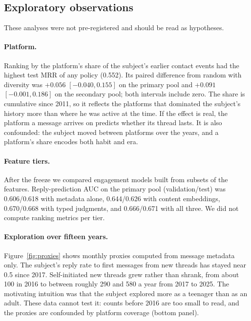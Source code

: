 \documentclass[11pt]{article}
\begin{document}
\subsection{Exploratory observations}
\label{sec:exploratory}

These analyses were not pre-registered and should be read as hypotheses.

\paragraph{Platform.} Ranking by the platform's share of the subject's earlier contact events had the highest test MRR of any policy (0.552). Its paired difference from random with diversity was $+0.056$ $[-0.040, 0.155]$ on the primary pool and $+0.091$ $[-0.001, 0.186]$ on the secondary pool; both intervals include zero. The share is cumulative since 2011, so it reflects the platforms that dominated the subject's history more than where he was active at the time. If the effect is real, the platform a message arrives on predicts whether its thread lasts. It is also confounded: the subject moved between platforms over the years, and a platform's share encodes both habit and era.

\paragraph{Feature tiers.} After the freeze we compared engagement models built from subsets of the features. Reply-prediction AUC on the primary pool (validation/test) was 0.606/0.618 with metadata alone, 0.644/0.626 with content embeddings, 0.670/0.668 with typed judgments, and 0.666/0.671 with all three. We did not compute ranking metrics per tier.

\paragraph{Exploration over fifteen years.} Figure~\ref{fig:proxies} shows monthly proxies computed from message metadata only. The subject's reply rate to first messages from new threads has stayed near 0.5 since 2017. Self-initiated new threads grew rather than shrank, from about 100 in 2016 to between roughly 290 and 580 a year from 2017 to 2025. The motivating intuition was that the subject explored more as a teenager than as an adult. These data cannot test it: counts before 2016 are too small to read, and the proxies are confounded by platform coverage (bottom panel).
\end{document}
